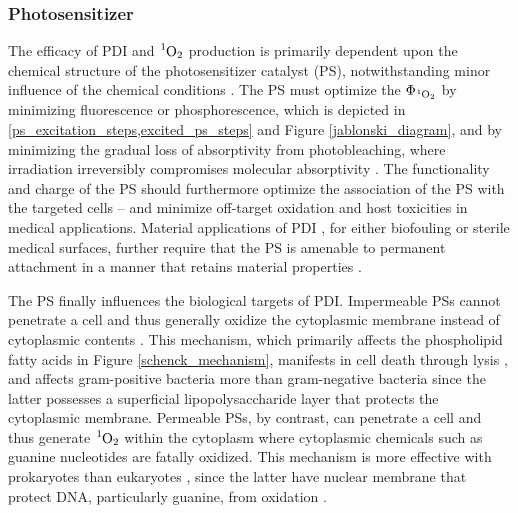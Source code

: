 \subsubsection*{Photosensitizer}
The efficacy of PDI and $\ce{^1O2}$ production is primarily dependent upon the chemical structure of the photosensitizer catalyst (PS), notwithstanding minor influence of the chemical conditions \cite{Kruk1998PhotophysicsLuminescence,Kullmann2012UltrafastBisporphyrin}. The PS must optimize the $\Phi_{\ce{^1O2}}$ by minimizing fluorescence or phosphorescence, which is depicted in \cref{ps_excitation_steps,excited_ps_steps} and Figure \ref{jablonski_diagram}, and by minimizing the gradual loss of absorptivity from photobleaching, where irradiation irreversibly compromises molecular absorptivity \cite{Bonnett2010ChemInformTherapy,Wasser1973TheMetallochlorins}. The functionality and charge of the PS should furthermore optimize the association of the PS with the targeted cells \cite{VanDerWal1997DeterminationBacteria,Dickson1989CellSurfaces} -- and minimize off-target oxidation \cite{Lambrechts2005PhotodynamicMice} and host toxicities \cite{Quishida2016PhotodynamicLight} in medical applications. Material applications of PDI \cite{Peddinti2018PhotodynamicThreat,Gottenbos2001AntimicrobialBacteria}, for either biofouling or sterile medical surfaces, further require that the PS is amenable to permanent attachment in a manner that retains material properties \cite{McCoy2014PhotodynamicControl}. 

The PS finally influences the biological targets of PDI. Impermeable PSs cannot penetrate a cell and thus generally oxidize the cytoplasmic membrane \cite{Specht1990DepolarizationAction,Ehrenberg1993ElectricAlterations} instead of cytoplasmic contents \cite{Maisch2004AntibacterialDermatology}. This mechanism, which primarily affects the phospholipid fatty acids in Figure \ref{schenck_mechanism}, manifests in cell death through lysis \cite{Sahu2009AtomicColi,Bertoloni1987RoleCells}, and affects gram-positive bacteria more than gram-negative bacteria \cite{Lauro2002PhotoinactivationConjugates,Merchat1996Meso-substitutedBacteria} since the latter possesses a superficial lipopolysaccharide layer that protects the cytoplasmic membrane. Permeable PSs, by contrast, can penetrate a cell and thus generate $\ce{^1O2}$ within the cytoplasm where cytoplasmic chemicals \cite{Bagchi1979RoleAcriflavine} such as guanine nucleotides \cite{Prat1997Determination9,Devasagayam1991FormationOxygen} are fatally oxidized. This mechanism is more effective with prokaryotes than eukaryotes \cite{Quishida2016PhotodynamicLight}, since the latter have nuclear membrane that protect DNA, particularly guanine, from oxidation \cite{Pereira2013PhotodynamicVitro}.

